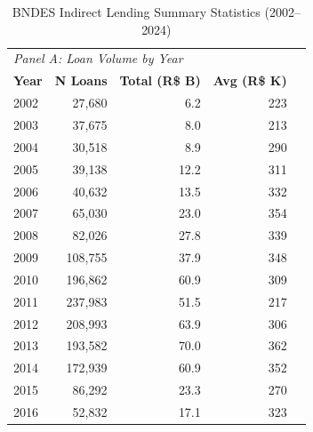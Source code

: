 \documentclass{article}
\begin{document}
\begin{table}[H]
    \centering
    \caption{BNDES Indirect Lending Summary Statistics (2002--2024)}
    \label{tab:bndes_summary}
    \begin{threeparttable}
        \small
        \begin{tabular}{lrrrr}
            \toprule
            \multicolumn{5}{l}{\textit{Panel A: Loan Volume by Year}}                           \\
            \textbf{Year}  & \textbf{N Loans}   & \textbf{Total (R\$ B)} & \textbf{Avg (R\$ K)} \\
            \midrule
            2002           & 27,680             & 6.2                    & 223                  \\
            2003           & 37,675             & 8.0                    & 213                  \\
            2004           & 30,518             & 8.9                    & 290                  \\
            2005           & 39,138             & 12.2                   & 311                  \\
            2006           & 40,632             & 13.5                   & 332                  \\
            2007           & 65,030             & 23.0                   & 354                  \\
            2008           & 82,026             & 27.8                   & 339                  \\
            2009           & 108,755            & 37.9                   & 348                  \\
            2010           & 196,862            & 60.9                   & 309                  \\
            2011           & 237,983            & 51.5                   & 217                  \\
            2012           & 208,993            & 63.9                   & 306                  \\
            2013           & 193,582            & 70.0                   & 362                  \\
            2014           & 172,939            & 60.9                   & 352                  \\
            2015           & 86,292             & 23.3                   & 270                  \\
            2016           & 52,832             & 17.1                   & 323                  \\

\end{tabular}
\end{threeparttable}
\end{table}
\end{document}
